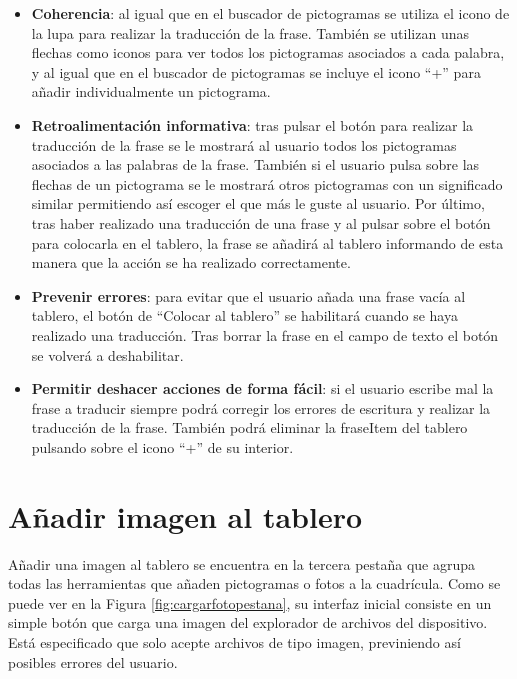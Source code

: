 \begin{itemize}
	\item \textbf{Coherencia}: al igual que en el buscador de pictogramas se utiliza el icono de la lupa para realizar la traducción de la frase. También se utilizan unas flechas como iconos para ver todos los pictogramas asociados a cada palabra, y al igual que en el buscador de pictogramas se incluye el icono “+” para añadir individualmente un pictograma.
	
	\item \textbf{Retroalimentación informativa}: tras pulsar el botón para realizar la traducción de la frase se le mostrará al usuario todos los pictogramas asociados a las palabras de la frase.  También si el usuario pulsa sobre las flechas de un pictograma se le mostrará otros pictogramas con un significado similar permitiendo así escoger el que más le guste al usuario. Por último, tras haber realizado una traducción de una frase y al pulsar sobre el botón para colocarla en el tablero, la frase se añadirá al tablero informando de esta manera que la acción se ha realizado correctamente.
	
	\item \textbf{Prevenir errores}: para evitar que el usuario añada una frase vacía al tablero, el botón de “Colocar al tablero” se habilitará cuando se haya realizado una traducción. Tras borrar la frase en el campo de texto el botón se volverá a deshabilitar.
	
	
	\item \textbf{Permitir deshacer acciones de forma fácil}: si el usuario escribe mal la frase a traducir siempre podrá corregir los errores de escritura y realizar la traducción de la frase. También podrá eliminar la fraseItem del tablero pulsando sobre el icono “+” de su interior.
	
\end{itemize}





\section{Añadir imagen al tablero}
\label{cap5:sec:imagen}
Añadir una imagen al tablero se encuentra en la tercera pestaña que agrupa todas las herramientas que añaden pictogramas o fotos a la cuadrícula. Como se puede ver en la Figura \ref{fig:cargarfotopestana}, su interfaz inicial consiste en un simple botón que carga una imagen del explorador de archivos del dispositivo. Está especificado que solo acepte archivos de tipo imagen, previniendo así posibles errores del usuario. 

